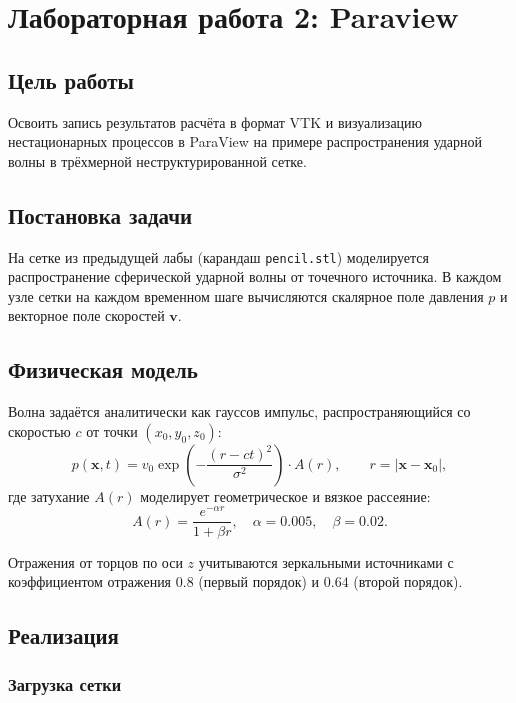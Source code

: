 \section{Лабораторная работа \textnumero{}2: Paraview}

\subsection{Цель работы}

Освоить запись результатов расчёта в формат VTK и визуализацию
нестационарных процессов в ParaView на примере распространения
ударной волны в трёхмерной неструктурированной сетке.

\subsection{Постановка задачи}

На сетке из предыдущей лабы (карандаш \texttt{pencil.stl}) моделируется
распространение сферической ударной волны от точечного источника.
В каждом узле сетки на каждом временном шаге вычисляются скалярное
поле давления $p$ и векторное поле скоростей $\mathbf{v}$.

\subsection{Физическая модель}

Волна задаётся аналитически как гауссов импульс, распространяющийся
со скоростью $c$ от точки $(x_0, y_0, z_0)$:
\begin{equation}
  p(\mathbf{x}, t) = v_0
    \exp\!\left(-\frac{(r - ct)^2}{\sigma^2}\right)
    \cdot A(r),
  \qquad r = |\mathbf{x} - \mathbf{x}_0|,
\end{equation}
где затухание $A(r)$ моделирует геометрическое и вязкое рассеяние:
\begin{equation}
  A(r) = \frac{e^{-\alpha r}}{1 + \beta r},
  \quad \alpha = 0.005,\quad \beta = 0.02.
\end{equation}

Отражения от торцов по оси $z$ учитываются зеркальными источниками
с коэффициентом отражения $0.8$ (первый порядок) и $0.64$ (второй порядок).

\subsection{Реализация}

\subsubsection{Загрузка сетки}


